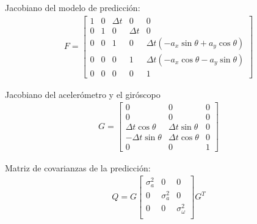 Jacobiano del modelo de predicción:
\begin{align}
F = 
\begin{bmatrix} 
1 	&0	&\Delta t	&0		&0\\
0 	&1	&0		&\Delta t	&0\\
0 	&0	&1		&0		&\Delta t\left(-a_x\sin{\theta} + a_y\cos{\theta}\right) \\
0 	&0	&0		&1		&\Delta t\left(-a_x\cos{\theta} - a_y\sin{\theta}\right) \\
0 	&0	&0		&0		&1
\end{bmatrix}
\end{align}

Jacobiano del acelerómetro y el giróscopo
\begin{align}
G = 
\begin{bmatrix} 
0 			&0			&0\\
0 			&0			&0\\
\Delta t \cos{\theta} 	&\Delta t \sin{\theta}	&0\\
-\Delta t \sin{\theta} 	&\Delta t \cos{\theta}	&0\\
0 			&0			&1		
\end{bmatrix}
\end{align}

Matriz de covarianzas de la predicción:
\begin{align}
Q = 
G
\begin{bmatrix} 
\sigma^2_a 	& 0 		& 0\\
0 		& \sigma^2_a 	& 0\\
0 		& 0 		& \sigma^2_\omega\\
\end{bmatrix}
G^T
\end{align}


\endinput
